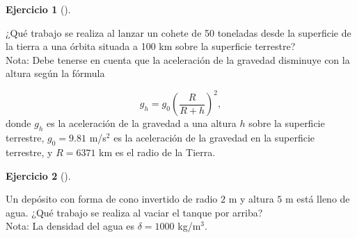 \documentclass[
  a4paper,
]{scrreport}
\theoremstyle{definition}
\newtheorem{exercise}{Ejercicio}[chapter]
\theoremstyle{remark}
\begin{document}
\begin{exercise}[]\protect\hypertarget{exr-trabajo-cohete}{}\label{exr-trabajo-cohete}

¿Qué trabajo se realiza al lanzar un cohete de 50 toneladas desde la
superficie de la tierra a una órbita situada a 100 km sobre la
superficie terrestre?\\
Nota: Debe tenerse en cuenta que la aceleración de la gravedad disminuye
con la altura según la fórmula

\[
g_h = g_0 \left(\frac{R}{R+h}\right)^2,
\] donde \(g_h\) es la aceleración de la gravedad a una altura \(h\)
sobre la superficie terrestre, \(g_0=9.81\) m/s\(^2\) es la aceleración
de la gravedad en la superficie terrestre, y \(R=6371\) km es el radio
de la Tierra.

\end{exercise}

\begin{tcolorbox}[enhanced jigsaw, coltitle=black, toptitle=1mm, colframe=quarto-callout-tip-color-frame, colbacktitle=quarto-callout-tip-color!10!white, breakable, opacityback=0, bottomtitle=1mm, opacitybacktitle=0.6, title=\textcolor{quarto-callout-tip-color}{\faLightbulb}\hspace{0.5em}{Solución}, arc=.35mm, leftrule=.75mm, toprule=.15mm, titlerule=0mm, bottomrule=.15mm, left=2mm, rightrule=.15mm, colback=white]

\end{tcolorbox}

\begin{exercise}[]\protect\hypertarget{exr-trabajo-deposito}{}\label{exr-trabajo-deposito}

Un depósito con forma de cono invertido de radio \(2\) m y altura \(5\)
m está lleno de agua. ¿Qué trabajo se realiza al vaciar el tanque por
arriba?\\
Nota: La densidad del agua es \(\delta = 1000\) kg/m\(^3\).

\end{exercise}
\end{document}
